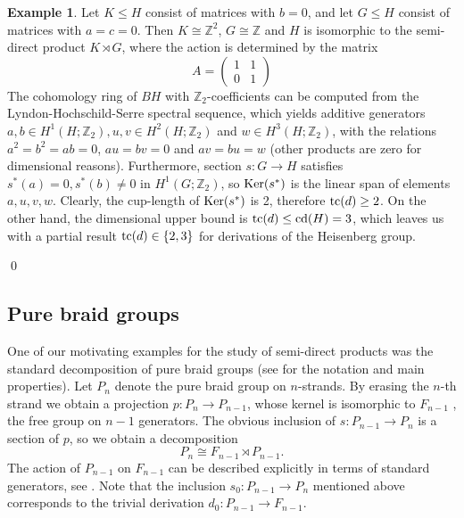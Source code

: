 \documentclass[11pt]{amsart}
\theoremstyle{plain}
\theoremstyle{definition}
\newtheorem{example}[theorem]{Example}
\newcommand{\ZZ}{{\mathbb{Z}}}
\newcommand{\Z}{\mathbb{Z}}
\newcommand{\Ker}{\mathop{\rm Ker}\nolimits}
\newcommand{\tc}{\mathop{\rm tc}\nolimits}
\newcommand{\cd}{\mathrm{cd}}
\begin{document}
\begin{example}
Let $K\le H$ consist of matrices with $b=0$, and let $G\le H$ consist of matrices with $a=c=0$.
Then $K\cong\ZZ^2$, $G\cong \ZZ$ and $H$ is isomorphic to the semi-direct product $K\rtimes G$, where 
the action is determined by the matrix 
$$
A=
\begin{pmatrix}
1 & 1\\
0 & 1
\end{pmatrix}
$$
The cohomology ring of $BH$ with $\Z_2$-coefficients can be computed from the 
Lyndon-Hochschild-Serre spectral sequence, which yields additive generators
$a,b\in H^1(H;\Z_2), u,v\in H^2(H;\Z_2)$ and $w\in H^3(H;\Z_2)$, with the relations
$a^2=b^2=ab=0$, $au=bv=0$ and $av=bu=w$ (other products are zero for dimensional reasons).
Furthermore, section $s\colon G\to H$ satisfies $s^*(a)=0, s^*(b)\ne 0$ in $H^1(G;\Z_2)$, so
$\Ker(s^*)$ is the linear span of elements $a,u,v,w$. Clearly, the cup-length 
of $\Ker(s^*)$ is 2, therefore $\tc(d)\ge 2$. On the other hand, the dimensional upper 
bound is $\tc(d)\le \cd(H)=3$, which leaves us with a partial result $\tc(d)\in\{2,3\}$ for
derivations of the Heisenberg group.

\qed
\end{example}


\subsection{Pure braid groups} One of our motivating examples for the study of semi-direct products 
was the standard decomposition of pure braid groups (see \cite{KasselTuraev2008} for the notation and main
properties). Let $P_n$ denote the pure braid group on $n$-strands. By erasing the $n$-th strand we
obtain a projection $p\colon P_n\to P_{n-1}$, whose kernel is isomorphic to $F_{n-1}$ , the free
group on $n-1$ generators. The obvious inclusion of $s\colon P_{n-1}\to P_n$ is
a section of $p$, so we obtain a decomposition $$P_n\cong F_{n-1}\rtimes P_{n-1}.$$
The action of $P_{n-1}$ on $F_{n-1}$ can be described explicitly in terms of standard generators, 
see \cite[Sec.1.3]{KasselTuraev2008}. Note that the inclusion  $s_0\colon P_{n-1}\to P_n$ mentioned above
corresponds to the trivial derivation $d_0\colon P_{n-1}\to F_{n-1}$. 
\end{document}

